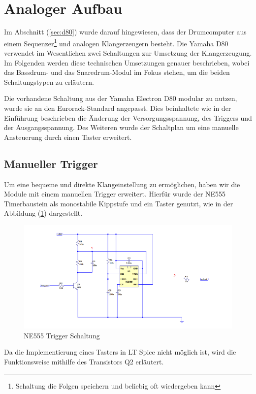 \section{Analoger Aufbau}
Im Abschnitt (\ref{sec:d80}) wurde darauf hingewiesen, dass der Drumcomputer aus einem Sequenzer\footnote{ Schaltung die Folgen speichern und beliebig oft wiedergeben kann} und analogen Klangerzeugern besteht. Die Yamaha D80 verwendet im Wesentlichen zwei Schaltungen zur Umsetzung der Klangerzeugung. Im Folgenden werden diese technischen Umsetzungen genauer beschrieben, wobei das Bassdrum- und das Snaredrum-Modul im Fokus stehen, um die beiden Schaltungstypen zu erläutern.


Die vorhandene Schaltung aus der Yamaha Electron D80 modular zu nutzen, wurde sie an den Eurorack-Standard angepasst. Dies beinhaltete wie in der Einführung beschrieben die Änderung der Versorgungsspannung, des Triggers und der Ausgangsspannung. Des Weiteren wurde der Schaltplan um eine manuelle Ansteuerung durch einen Taster erweitert.

\subsection{Manueller Trigger}

Um eine bequeme und direkte Klangeinstellung zu ermöglichen, haben wir die Module mit einem manuellen Trigger erweitert. Hierfür wurde der NE555 Timerbaustein als monostabile Kippstufe und ein Taster genutzt, wie in der Abbildung (\ref{fig:Ne555}) dargestellt.


\begin{figure}[h]
    \centering
    \includegraphics[width=1\textwidth]{Images/Ne555.png}
    \caption[Ne555]{NE555 Trigger Schaltung}
    \label{fig:Ne555}
\end{figure}

Da die Implementierung eines Tasters in LT Spice nicht möglich ist, wird die Funktionsweise mithilfe des Transistors Q2 erläutert.

